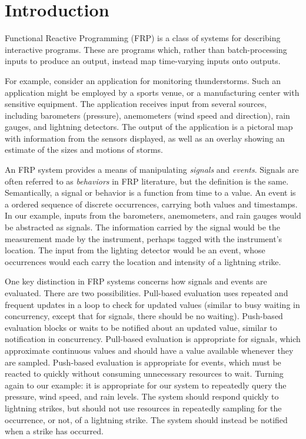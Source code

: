 \section{Introduction}
\label{section:Introduction}

Functional Reactive Programming (FRP) is a class of systems for describing
interactive programs. These are programs which, rather than batch-processing
inputs to produce an output, instead map time-varying inputs onto outputs.

For example, consider an application for monitoring thunderstorms. Such an
application might be employed by a sports venue, or a manufacturing center with
sensitive equipment. The application receives input from several sources,
including barometers (pressure), anemometers (wind speed and direction), rain
gauges, and lightning detectors. The output of the application is a pictoral map
with information from the sensors displayed, as well as an overlay showing an
estimate of the sizes and motions of storms.

An FRP system provides a means of manipulating {\em signals} and
{\em events}. Signals are often referred to as {\em behaviors} in FRP literature,
but the definition is the same.  Semantically, a signal or behavior is a
function from time to a value. An event is a ordered sequence of discrete
occurrences, carrying both values and timestamps. In our example, inputs from
the barometers, anemometers, and rain gauges would be abstracted as signals. The
information carried by the signal would be the measurement made by the
instrument, perhaps tagged with the instrument's location. The input from the
lighting detector would be an event, whose occurrences would each carry the
location and intensity of a lightning strike.

One key distinction in FRP systems concerns how signals and events are
evaluated. There are two possibilities. Pull-based evaluation uses repeated and
frequent updates in a loop to check for updated values (similar to busy waiting
in concurrency, except that for signals, there should be no waiting). Push-based
evaluation blocks or waits to be notified about an updated value, similar to
notification in concurrency. Pull-based evaluation is appropriate for signals,
which approximate continuous values and should have a value available whenever
they are sampled. Push-based evaluation is appropriate for events, which must be
reacted to quickly without consuming unnecessary resources to wait. Turning
again to our example: it is appropriate for our system to repeatedly query the
pressure, wind speed, and rain levels. The system should respond quickly to
lightning strikes, but should not use resources in repeatedly sampling for the
occurrence, or not, of a lightning strike. The system should instead be notified
when a strike has occurred.

